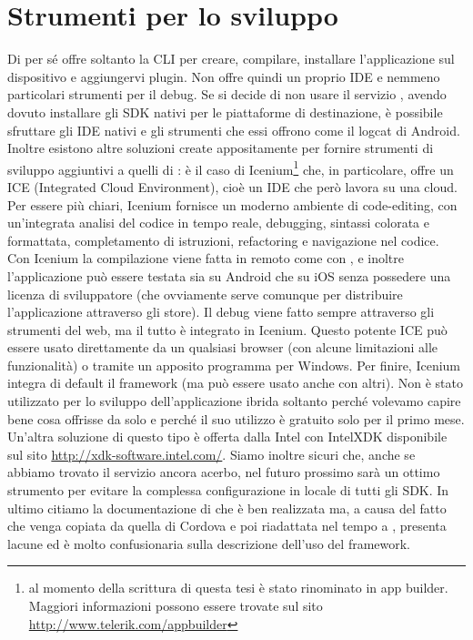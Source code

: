     \section{Strumenti per lo sviluppo}
    Di per sé \pg{} offre soltanto la CLI per creare, compilare,
    installare l'applicazione sul dispositivo e aggiungervi plugin. Non
    offre quindi un proprio IDE e nemmeno particolari strumenti per il
    debug. Se si decide di non usare il servizio \pgb{}, avendo dovuto
    installare gli SDK nativi per le piattaforme di destinazione, è
    possibile sfruttare gli IDE nativi e gli strumenti che essi offrono
    come il logcat di Android. Inoltre esistono altre soluzioni create
    appositamente per fornire strumenti di sviluppo aggiuntivi a quelli di
    \pg{}: è il caso di Icenium\footnote{al momento della scrittura di
    questa tesi è stato rinominato in app builder.
    Maggiori informazioni possono essere trovate sul sito
    \url{http://www.telerik.com/appbuilder}} che, in particolare, offre un
    ICE (Integrated Cloud Environment), cioè un IDE che però lavora su una
    cloud. Per essere più chiari, Icenium fornisce un moderno ambiente di
    code-editing, con un'integrata analisi del codice in tempo reale,
    debugging, sintassi colorata e formattata, completamento di istruzioni,
    refactoring e navigazione nel codice. Con Icenium la compilazione
    viene fatta in remoto come con \pgb{}, e inoltre l'applicazione
    può essere testata sia su Android che su iOS senza possedere una
    licenza di sviluppatore (che ovviamente serve comunque per distribuire
    l'applicazione attraverso gli store). Il debug viene fatto sempre
    attraverso gli strumenti del web, ma il tutto è integrato in Icenium.
    Questo potente ICE può essere usato direttamente da un qualsiasi browser
    (con alcune limitazioni alle funzionalità) o tramite un apposito
    programma per Windows. Per finire, Icenium integra di default il
    frame\-work \kendomob{} (ma può essere usato anche con altri). Non
    è stato utilizzato per lo sviluppo dell'applicazione ibrida soltanto
    perché volevamo capire bene cosa offrisse da solo \pg{} e perché il
    suo utilizzo è gratuito solo per il primo mese. Un'altra soluzione di
    questo tipo è offerta dalla Intel con IntelXDK disponibile sul sito
    \url{http://xdk-software.intel.com/}. Siamo inoltre sicuri che,
    anche se abbiamo trovato il servizio \pgb{} ancora acerbo, nel
    futuro prossimo sarà un ottimo strumento per evitare la complessa
    configurazione in locale di tutti gli SDK. In ultimo citiamo la
    documentazione di \pg{} che è ben realizzata ma, a causa del fatto che venga
    copiata da quella di Cordova e poi riadattata nel tempo a \pg{},
    presenta lacune ed è molto confusionaria sulla descrizione dell'uso
    del frame\-work.

